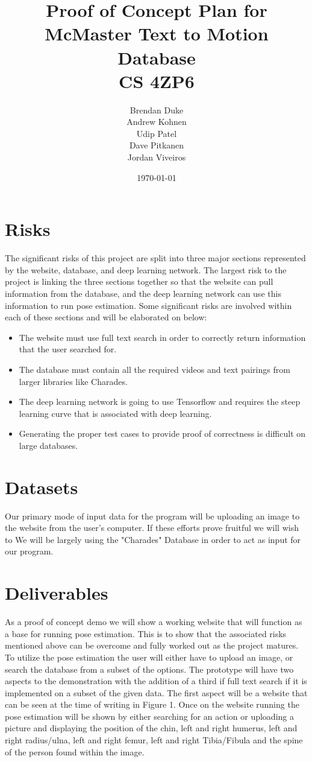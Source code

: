 \documentclass[a4paper, 12pt]{article}
\date{\today}
\title{Proof of Concept Plan for McMaster Text to Motion Database \\CS 4ZP6}
\author{Brendan Duke\\
        Andrew Kohnen\\
        Udip Patel\\
        Dave Pitkanen\\
        Jordan Viveiros}
\begin{document}
\maketitle

\section{Risks}
The significant risks of this project are split into three major sections represented by the website, database, and deep learning network. The largest risk to the project is linking the three sections together so that the website can pull information from the database, and the deep learning network can use this information to run pose estimation.
Some significant risks are involved within each of these sections and will be elaborated on below:
\begin{itemize}
    \item The website must use full text search in order to correctly return information that the user searched for.
    \item The database must contain all the required videos and text pairings from larger libraries like Charades.
    \item The deep learning network is going to use Tensorflow and requires the steep learning curve that is associated with deep learning.
    \item Generating the proper test cases to provide proof of correctness is difficult on large databases.
\end{itemize}

\section{Datasets}
{Our primary mode of input data for the program will be uploading an image to the website from the user's computer. If these efforts prove fruitful we will wish to We will be largely using the "Charades" Database in order to act as input for our program.}

\section{Deliverables}
{As a proof of concept demo we will show a working website that will function as a base for running pose estimation. This is to show that the associated risks mentioned above can be overcome and fully worked out as the project matures. To utilize the pose estimation the user will either have to upload an image, or search the database from a subset of the options. The prototype will have two aspects to the demonstration with the addition of a third if full text search if it is implemented on a subset of the given data. The first aspect will be a website that can be seen at the time of writing in Figure 1. Once on the website running the pose estimation will be shown by either searching for an action or uploading a picture and displaying the position of the chin, left and right humerus, left and right radius/ulna, left and right femur, left and right Tibia/Fibula and the spine of the person found within the image. 
}
\end{document}

